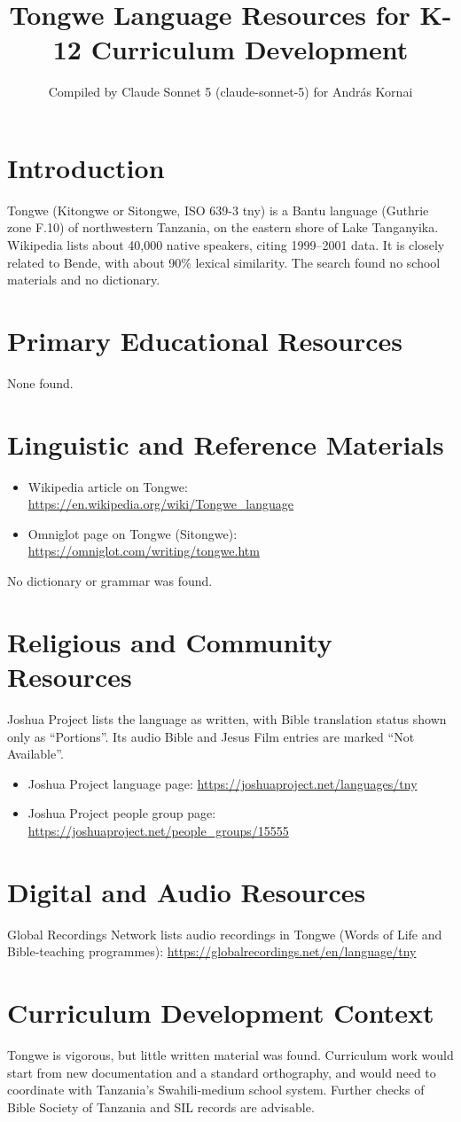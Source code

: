 \documentclass[12pt]{article}
\title{Tongwe Language Resources for K-12 Curriculum Development}
\author{Compiled by Claude Sonnet 5 (claude-sonnet-5) for Andr\'as Kornai}
\date{}
\begin{document}
\maketitle

\section{Introduction}
Tongwe (Kitongwe or Sitongwe, ISO 639-3 tny) is a Bantu language (Guthrie zone F.10) of northwestern Tanzania, on the eastern shore of Lake Tanganyika. Wikipedia lists about 40,000 native speakers, citing 1999--2001 data. It is closely related to Bende, with about 90\% lexical similarity. The search found no school materials and no dictionary.

\section{Primary Educational Resources}
None found.

\section{Linguistic and Reference Materials}
\begin{itemize}
\item Wikipedia article on Tongwe: \url{https://en.wikipedia.org/wiki/Tongwe_language}
\item Omniglot page on Tongwe (Sitongwe): \url{https://omniglot.com/writing/tongwe.htm}
\end{itemize}
No dictionary or grammar was found.

\section{Religious and Community Resources}
Joshua Project lists the language as written, with Bible translation status shown only as ``Portions''. Its audio Bible and Jesus Film entries are marked ``Not Available''.
\begin{itemize}
\item Joshua Project language page: \url{https://joshuaproject.net/languages/tny}
\item Joshua Project people group page: \url{https://joshuaproject.net/people_groups/15555}
\end{itemize}

\section{Digital and Audio Resources}
Global Recordings Network lists audio recordings in Tongwe (Words of Life and Bible-teaching programmes): \url{https://globalrecordings.net/en/language/tny}

\section{Curriculum Development Context}
Tongwe is vigorous, but little written material was found. Curriculum work would start from new documentation and a standard orthography, and would need to coordinate with Tanzania's Swahili-medium school system. Further checks of Bible Society of Tanzania and SIL records are advisable.
\end{document}
